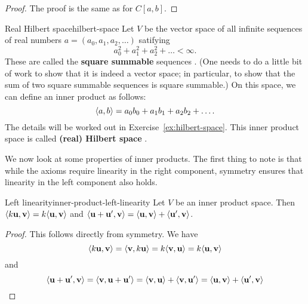 \begin{proof}
  The proof is the same as for $C[a,b]$. 
\end{proof}

\begin{example}{Real Hilbert space}{hilbert-space}
  Let $V$ be the vector space of all infinite sequences of real
  numbers $a=(a_0,a_1,a_2,\ldots)$ satifying
  \begin{equation*}
    a_0^2 + a_1^2 + a_2^2 + \ldots < \infty.
  \end{equation*}
  These are called the \textbf{square summable} sequences%
  . (One needs
  to do a little bit of work to show that it is indeed a vector space;
  in particular, to show that the sum of two square summable sequences
  is square summable.) On this space, we can
  define an inner product as follows:
  \begin{equation*}
    \langle a,b\rangle = a_0b_0 + a_1b_1 + a_2b_2 + \ldots.
  \end{equation*}
  The details will be worked out in Exercise~\ref{ex:hilbert-space}.
  This inner product space is called \textbf{(real) Hilbert space}%
  .
\end{example}

We now look at some properties of inner products. The first thing to
note is that while the axioms require linearity in the right
component, symmetry ensures that linearity in the left component also
holds.

\begin{proposition}{Left linearity}{inner-product-left-linearity}
  Let $V$ be an inner product space. Then
  $\langle k\mbox{\bf u},\mbox{\bf v}\rangle = k\langle\mbox{\bf u},\mbox{\bf v}\rangle$ and
  $\langle\mbox{\bf u}+\mbox{\bf u}',\mbox{\bf v}\rangle = \langle\mbox{\bf u},\mbox{\bf v}\rangle +
  \langle\mbox{\bf u}',\mbox{\bf v}\rangle$.
\end{proposition}

\begin{proof}
  This follows directly from symmetry. We have
  \begin{equation*}
    \langle k\mbox{\bf u},\mbox{\bf v}\rangle
    = \langle\mbox{\bf v},k\mbox{\bf u}\rangle
    = k\langle\mbox{\bf v},\mbox{\bf u}\rangle
    = k\langle\mbox{\bf u},\mbox{\bf v}\rangle
  \end{equation*}
  and
  \begin{equation*}
    \langle\mbox{\bf u}+\mbox{\bf u}',\mbox{\bf v}\rangle
    = \langle\mbox{\bf v},\mbox{\bf u}+\mbox{\bf u}'\rangle
    = \langle\mbox{\bf v},\mbox{\bf u}\rangle + \langle\mbox{\bf v},\mbox{\bf u}'\rangle
    = \langle\mbox{\bf u},\mbox{\bf v}\rangle + \langle\mbox{\bf u}',\mbox{\bf v}\rangle
  \end{equation*}
\end{proof}

